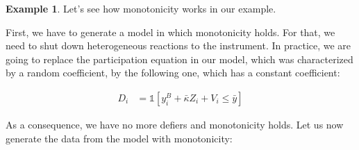 \documentclass[
]{book}
\newcommand{\uns}[1]{\mathds{1}[ #1 ]}
\theoremstyle{definition}
\theoremstyle{definition}
\newtheorem{example}{Example}[chapter]
\theoremstyle{definition}
\theoremstyle{definition}
\theoremstyle{remark}
\begin{document}
\begin{example}
\protect\hypertarget{exm:unnamed-chunk-157}{}{\label{exm:unnamed-chunk-157} }Let's see how monotonicity works in our example.
\end{example}

First, we have to generate a model in which monotonicity holds.
For that, we need to shut down heterogeneous reactions to the instrument.
In practice, we are going to replace the participation equation in our model, which was characterized by a random coefficient, by the following one, which has a constant coefficient:

\begin{align*}
  D_i & = \uns{y_i^B+\bar{\kappa} Z_i + V_i\leq\bar{y}} 
\end{align*}

As a consequence, we have no more defiers and monotonicity holds.
Let us now generate the data from the model with monotonicity:
\end{document}
